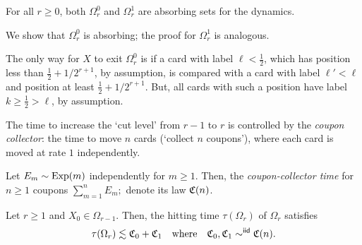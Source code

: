 \documentclass{article}
\begin{document}
\begin{lem}
\label{res:harm:1:absorbing}
For all $r \ge 0$,
both $\Omega_r^0$ and $\Omega_r^1$ are absorbing sets for the dynamics.
\end{lem}

\begin{Proof}
We show that $\Omega_r^0$ is absorbing; the proof for $\Omega_r^1$ is analogous.

The only way for $X$ to exit $\Omega_r^0$ is if a card with label $\ell < \tfrac12$, which has position less than $\tfrac12 + 1/2^{r+1}$, by assumption, is compared with a card with label $\ell' < \ell$ and position at least $\tfrac12 + 1/2^{r+1}$.
But, all cards with such a position have label $k \ge \tfrac12 > \ell$, by assumption.
\end{Proof}

The time to increase the `cut level' from $r-1$ to $r$ is controlled by the \textit{coupon collector}:
the time to move $n$ cards (`collect $n$ coupons'), where each card is moved at rate $1$ independently.

\begin{defn}%
\label{def:harm:cc}
Let $E_m \sim \operatorname{Exp}(m)$ independently for $m \ge 1$.
Then, the \textit{coupon-collector time} for $n \ge 1$ coupons
\(
	\sum_{m=1}^n
	E_m;
\)
denote its law $\mathfrak{C}(n)$.
\end{defn}


\begin{prop}
\label{res:harm:1:hit}
Let $r \ge 1$ and $X_0 \in \Omega_{r-1}$.
Then,
the hitting time $\tau(\Omega_r)$ of $\Omega_r$ satisfies
\[
	\tau(\Omega_r)
\lesssim
	\mfC_0 + \mfC_1
\Qwhere
	\mfC_0, \mfC_1 \sim^\iid \mfC(n).
\]
\end{prop}
\end{document}

